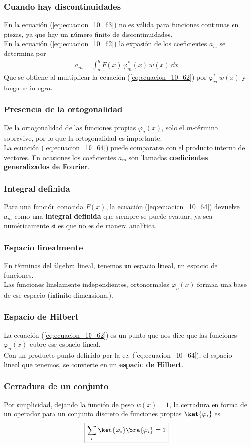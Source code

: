 \begin{frame}
\frametitle{Cuando hay discontinuidades}
En la ecuación (\ref{eq:ecuacion_10_63}) no es válida para funciones continuas en piezas, ya que hay un número finito de discontinuidades.
\\
\bigskip
\pause
 En la ecuación (\ref{eq:ecuacion_10_62}) la expasión de los coeficientes $a_{m}$ se determina por
\begin{align}
a_{m} = \int_{a}^{b} F(x) \, \varphi_{m}^{*} (x) \, w(x) \, \dd{x}
\label{eq:ecuacion_10_64}
\end{align}
Que se obtiene al multiplicar la ecuación (\ref{eq:ecuacion_10_62}) por $\varphi_{m}^{*} \, w(x)$ y luego se integra.
\end{frame}
\begin{frame}
\frametitle{Presencia de la ortogonalidad}
De la ortogonalidad de las funciones propias $\varphi_{n}(x)$, solo el $m$-término sobrevive, por lo que la ortogonalidad es importante.
\\
\bigskip
La ecuación (\ref{eq:ecuacion_10_64}) puede compararse con el producto interno de vectores. En ocasiones los coeficientes $a_{m}$ son llamados \textbf{coeficientes generalizados de Fourier}.
\end{frame}
\begin{frame}
\frametitle{Integral definida}
Para una función conocida $F(x)$, la ecuación (\ref{eq:ecuacion_10_64}) devuelve $a_{m}$ como una \textbf{integral definida} que siempre se puede evaluar, ya sea numéricamente si es que no es de manera analítica.
\end{frame}
\begin{frame}
\frametitle{Espacio linealmente}
En términos del álgebra lineal, tenemos un espacio lineal, un espacio de funciones. 
\\
\bigskip
Las funciones linelamente independientes, ortonormales $\varphi_{n}(x)$ forman una base de ese espacio (infinito-dimensional).
\end{frame}
\begin{frame}
\frametitle{Espacio de Hilbert}
La ecuación (\ref{eq:ecuacion_10_62}) es un punto que nos dice que las funciones $\varphi_{n}(x)$ cubre ese espacio lineal.
\\
\bigskip
\pause
Con un producto punto definido por la ec. (\ref{eq:ecuacion_10_64}), el espacio lineal que tenemos, se convierte en un \textbf{espacio de Hilbert}.
\end{frame}
\begin{frame}
\frametitle{Cerradura de un conjunto}
Por simplicidad, dejando la función de peso $w(x)=1$, la cerradura en forma de un operador para un conjunto discreto de funciones propias $\ket{\varphi_{i}}$ es
\begin{align*}
\boxed{\sum_{i} \ket{\varphi_{i}} \bra{\varphi_{i}} =  1}
\end{align*}
\end{frame}
